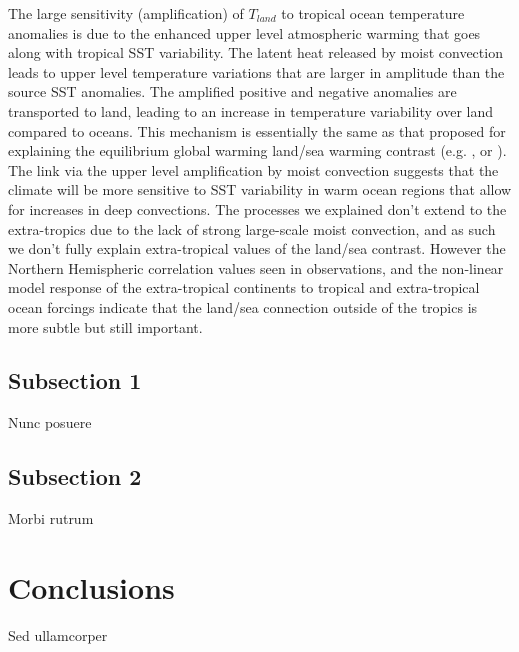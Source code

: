 The large sensitivity (amplification) of $T_{land}$ to tropical ocean 
temperature anomalies is due to the enhanced upper level atmospheric warming 
that goes along with tropical SST variability. The latent heat released by moist 
convection leads to upper level temperature variations that are larger in 
amplitude than the source SST anomalies. The amplified positive and negative 
anomalies are transported to land, leading to an increase in temperature 
variability over land compared to oceans. This mechanism is essentially the same 
as that proposed for explaining the equilibrium global warming land/sea warming 
contrast (e.g.  \citet{Joshi2008}, \citet{Dommenget2009} or \citet{Byrne2013}).  
The link via the upper level amplification by moist convection suggests that the 
climate will be more sensitive to SST variability in warm ocean regions that 
allow for increases in deep convections. The processes we explained don't extend 
to the extra-tropics due to the lack of strong large-scale moist convection, and 
as such we don't fully explain extra-tropical values of the land/sea contrast.  
However the Northern Hemispheric correlation values seen in observations, and 
the non-linear model response of the extra-tropical continents to tropical and 
extra-tropical ocean forcings indicate that the land/sea connection outside of 
the tropics is more subtle but still important.

\subsection{Subsection 1}

Nunc posuere 


\subsection{Subsection 2}
Morbi rutrum 


\section{Conclusions}

Sed ullamcorper